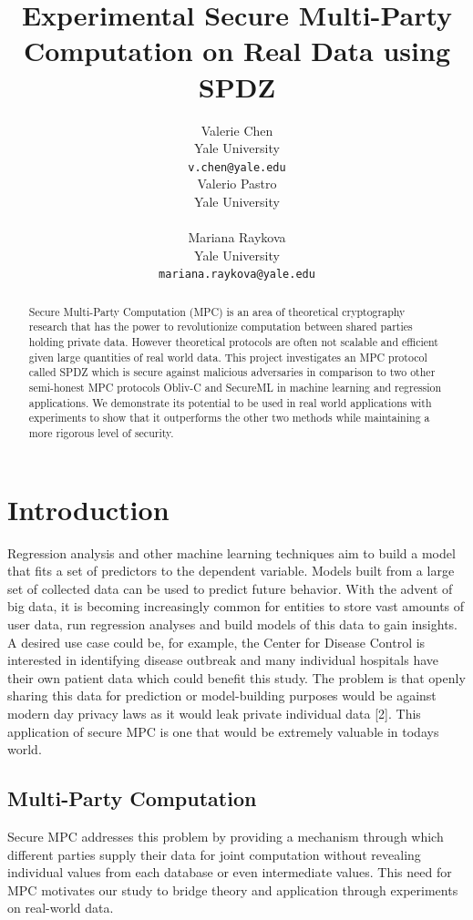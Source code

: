 \documentclass{article}
\title{Experimental Secure Multi-Party Computation on Real Data using SPDZ}
\author{
  Valerie Chen\\
  Yale University\\
  \texttt{v.chen@yale.edu} \\
  \And
  Valerio Pastro\\
  Yale University\\
  \textt{valerio.pastro@yale.edu}\\
  \And
  Mariana Raykova \\
  Yale University \\
  \texttt{mariana.raykova@yale.edu} \\
}
\begin{document}
\maketitle

\begin{abstract}
  Secure Multi-Party Computation (MPC) is an area of theoretical cryptography research that has the power to revolutionize computation between shared parties holding private data. However theoretical protocols are often not scalable and efficient given large quantities of real world data. This project investigates an MPC protocol called SPDZ which is secure against malicious adversaries in comparison to two other semi-honest MPC protocols Obliv-C and SecureML in machine learning and regression applications. We demonstrate its potential to be used in real world applications with experiments to show that it outperforms the other two methods while maintaining a more rigorous level of security.
\end{abstract}

\section{Introduction}

Regression analysis and other machine learning techniques aim to build a model that fits a set of predictors to the dependent variable. Models built from a large set of collected data can be used to predict future behavior. With the advent of big data, it is becoming increasingly common for entities to store vast amounts of user data, run regression analyses and build models of this data to gain insights. A desired use case could be, for example, the Center for Disease Control is interested in identifying disease outbreak and many individual hospitals have their own patient data which could benefit this study. The problem is that openly sharing this data for prediction or model-building purposes would be against modern day privacy laws as it would leak private individual data [2]. This application of secure MPC is one that would be extremely valuable in today\textquotesingle s world.

\subsection{Multi-Party Computation}

Secure MPC addresses this problem by providing a mechanism through which different parties supply their data for joint computation without revealing individual values from each database or even intermediate values. This need for MPC motivates our study to bridge theory and application through experiments on real-world data. 
\end{document}
